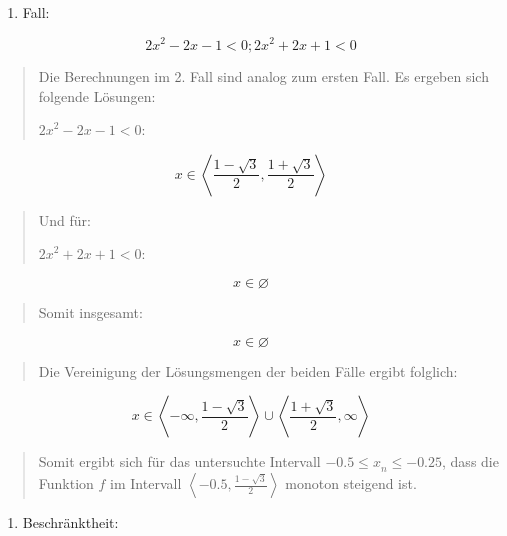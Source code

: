 \documentclass[a4paper, 12pt]{book}
\begin{document}
\begin{enumerate}
\def\labelenumi{\arabic{enumi}.}
\setcounter{enumi}{1}
\item
  Fall:
\end{enumerate}

\[{2x}^{2} - 2x - 1 < 0;{2x}^{2} + 2x + 1 < 0\]

\begin{quote}
Die Berechnungen im 2. Fall sind analog zum ersten Fall. Es ergeben sich
folgende Lösungen:

\({2x}^{2} - 2x - 1 < 0\):
\end{quote}

\[x \in \left\langle \frac{1 - \sqrt{3}}{2},\frac{1 + \sqrt{3}}{2} \right\rangle\]

\begin{quote}
Und für:

\({2x}^{2} + 2x + 1 < 0\):
\end{quote}

\[x \in \varnothing\]

\begin{quote}
Somit insgesamt:
\end{quote}

\[x \in \varnothing\]

\begin{quote}
Die Vereinigung der Lösungsmengen der beiden Fälle ergibt folglich:
\end{quote}

\[x \in \left\langle  - \infty,\frac{1 - \sqrt{3}}{2} \right\rangle \cup \left\langle \frac{1 + \sqrt{3}}{2},\infty \right\rangle\]

\begin{quote}
Somit ergibt sich für das untersuchte Intervall
\(- 0.5{\leq x}_{n} \leq  - 0.25\), dass die Funktion \(f\) im
Intervall
\(\left\langle - 0.5,\frac{1 - \sqrt{3}}{2} \right\rangle\)
monoton steigend ist.
\end{quote}

\begin{enumerate}
\def\labelenumi{\arabic{enumi})}
\setcounter{enumi}{1}
\item
  Beschränktheit:
\end{enumerate}
\end{document}
